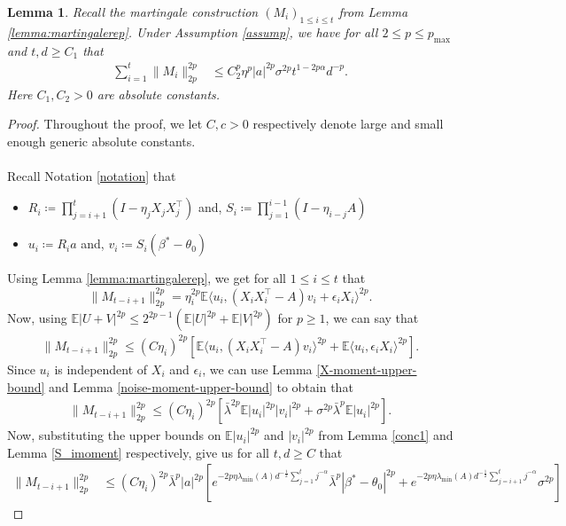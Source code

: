 \documentclass[11pt, reqno,english]{amsart}
\newtheorem{lemma}{Lemma}[section]
\begin{document}
\begin{lemma}\label{first-term-numerator}
Recall the martingale construction $(M_i)_{1 \leq i \leq t}$ from Lemma \ref{lemma:martingalerep}. Under Assumption \ref{assump}, we have for all $2 \leq p \leq p_{\max}$ and $t, d \geq C_1$ that
\begin{align*}
    \sum_{i = 1}^t\|M_i\|^{2p}_{2p} &\leq C_2^p \eta^p |a|^{2p}\sigma^{2p}t^{1-2p\alpha}d^{-p}.
\end{align*}
Here $C_1, C_2 > 0$ are absolute constants.
\end{lemma}
\begin{proof}
Throughout the proof, we let $C, c > 0$ respectively denote large and small enough generic absolute constants.
\\\\
Recall Notation \ref{notation} that 
\begin{itemize}
    \item $R_i \coloneqq \prod_{j = i+1}^{t}(I - \eta_{j}X_{j}X_{j}^\top)$ and, $S_i \coloneqq \prod_{j = 1}^{i-1}(I - \eta_{i-j}A)$
    \item $u_i \coloneqq R_ia$ and, $v_i \coloneqq S_i(\beta^* - \theta_0)$
\end{itemize}
Using Lemma \ref{lemma:martingalerep}, we get for all $1 \leq i \leq t$ that
$$
\|M_{t-i+1}\|_{2p}^{2p} = \eta_i^{2p}\mathbb{E}\langle u_i, (X_iX^\top_i - A)v_i + \epsilon_i X_i \rangle^{2p}.
$$
Now, using $\mathbb{E}|U + V|^{2p} \leq 2^{2p-1}(\mathbb{E}|U|^{2p} + \mathbb{E}|V|^{2p})$ for $p \geq 1$, we can say that
\begin{align*}
    \|M_{t-i+1}\|_{2p}^{2p} \leq (C\eta_i)^{2p}[\mathbb{E}\langle u_i, (X_i X^\top_i - A)v_i \rangle^{2p} + \mathbb{E}\langle u_i, \epsilon_i X_i \rangle^{2p}].
\end{align*}
Since $u_i$ is independent of $X_i$ and $\epsilon_i$, we can use Lemma \ref{X-moment-upper-bound} and Lemma \ref{noise-moment-upper-bound} to obtain that
\begin{align*}
   \|M_{t-i+1}\|^{2p}_{2p} \leq (C \eta_i)^{2p} [\bar{\lambda}^{2p}\mathbb{E}|u_i|^{2p}|v_i|^{2p} + \sigma^{2p} \bar{\lambda}^p \mathbb{E}|u_i|^{2p}].
\end{align*}
Now, substituting the upper bounds on $\mathbb{E}|u_i|^{2p}$ and $|v_i|^{2p}$ from Lemma \ref{conc1} and Lemma \ref{S_imoment} respectively, give us for all $t,d \geq C$ that
\begin{align*}
    \|M_{t-i+1}\|^{2p}_{2p} &\leq (C\eta_i)^{2p}\bar{\lambda}^p|a|^{2p}[e^{-2p\eta \lambda_{\min}(A)d^{-\frac{1}{2}}\sum_{j = 1}^t j^{-\alpha}}\bar{\lambda}^p |\beta^* - \theta_0|^{2p}+ e^{-2p\eta \lambda_{\min}(A)d^{-\frac{1}{2}}\sum_{j = i+1}^t j^{-\alpha}}\sigma^{2p}]

\end{align*}
\end{proof}
\end{document}

